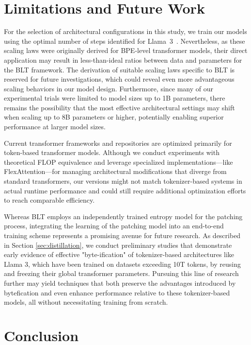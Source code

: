 \section{Limitations and Future Work}

For the selection of architectural configurations in this study, we train our models using the optimal number of steps identified for Llama~3~\citep{dubey2024llama}. Nevertheless, as these scaling laws were originally derived for BPE-level transformer models, their direct application may result in less-than-ideal ratios between data and parameters for the {\textsc BLT} framework. The derivation of suitable scaling laws specific to {\textsc BLT} is reserved for future investigations, which could reveal even more advantageous scaling behaviors in our model design. Furthermore, since many of our experimental trials were limited to model sizes up to 1B parameters, there remains the possibility that the most effective architectural settings may shift when scaling up to 8B parameters or higher, potentially enabling superior performance at larger model sizes.

Current transformer frameworks and repositories are optimized primarily for token-based transformer models. Although we conduct experiments with theoretical FLOP equivalence and leverage specialized implementations—like FlexAttention—for managing architectural modifications that diverge from standard transformers, our versions might not match tokenizer-based systems in actual runtime performance and could still require additional optimization efforts to reach comparable efficiency.

Whereas {\textsc BLT} employs an independently trained entropy model for the patching process, integrating the learning of the patching model into an end-to-end training scheme represents a promising avenue for future research. As described in Section \ref{sec:distillation}, we conduct preliminary studies that demonstrate early evidence of effective "byte-ification" of tokenizer-based architectures like Llama 3, which have been trained on datasets exceeding 10T tokens, by reusing and freezing their global transformer parameters. Pursuing this line of research further may yield techniques that both preserve the advantages introduced by bytefication and even enhance performance relative to these tokenizer-based models, all without necessitating training from scratch.

\section{Conclusion}
\label{section:conclusion}

